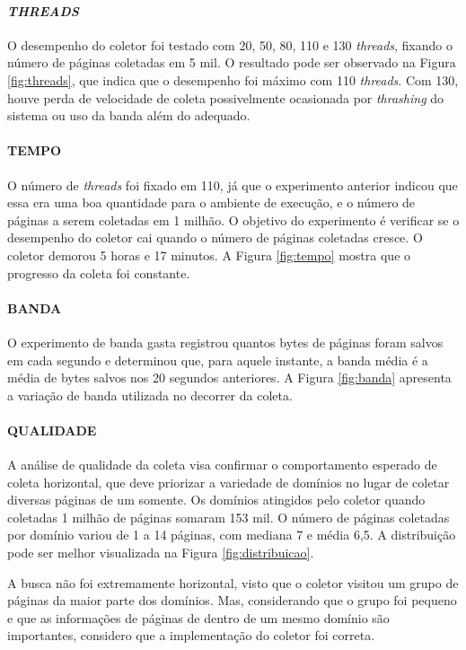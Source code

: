 \documentclass[paper=a4, fontsize=11pt]{scrartcl}
\numberwithin{equation}{section}		%
\numberwithin{figure}{section}			%
\numberwithin{table}{section}				%
\begin{document}
\paragraph{\textbf{\textit{THREADS}}} O desempenho do coletor foi testado com 20, 50, 80, 110 e 130 \textit{threads}, fixando o número de páginas coletadas em 5 mil. O resultado pode ser observado na Figura \ref{fig:threads}, que indica que o desempenho foi máximo com 110 \textit{threads}. Com 130, houve perda de velocidade de coleta possivelmente ocasionada por \textit{thrashing} do sistema ou uso da banda além do adequado.

\paragraph{\textbf{TEMPO}} O número de \textit{threads} foi fixado em 110, já que o experimento anterior indicou que essa era uma boa quantidade para o ambiente de execução, e o número de páginas a serem coletadas em 1 milhão. O objetivo do experimento é verificar se o desempenho do coletor cai quando o número de páginas coletadas cresce. O coletor demorou 5 horas e 17 minutos. A Figura \ref{fig:tempo} mostra que o progresso da coleta foi constante.

\paragraph{\textbf{BANDA}} O experimento de banda gasta registrou quantos bytes de páginas foram salvos em cada segundo e determinou que, para aquele instante, a banda média é a média de bytes salvos nos 20 segundos anteriores. A Figura \ref{fig:banda} apresenta a variação de banda utilizada no decorrer da coleta.

\paragraph{\textbf{QUALIDADE}} A análise de qualidade da coleta visa confirmar o comportamento esperado de coleta horizontal, que deve priorizar a variedade 
de domínios no lugar de coletar diversas páginas de um somente. Os domínios atingidos pelo coletor quando coletadas 1 milhão de páginas somaram 153 mil. O número de páginas coletadas por domínio variou de 1 a 14 páginas, com mediana 7 e média 6,5. A distribuição pode ser melhor visualizada na Figura \ref{fig:distribuicao}.

A busca não foi extremamente horizontal, visto que o coletor visitou um grupo de páginas da maior parte dos domínios. Mas, considerando que o grupo foi pequeno e que as informações de páginas de dentro de um mesmo domínio são importantes, considero que a implementação do coletor foi correta.
\end{document}
